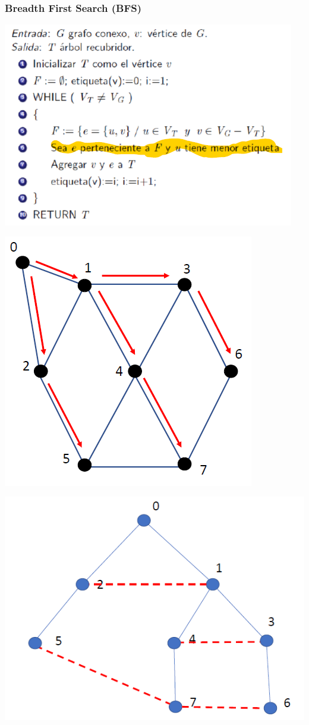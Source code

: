 \documentclass{article}
\begin{document}
\subsubsection{Breadth First Search (BFS)}
\begin{center}
    \includegraphics[width=.60\textwidth]{algBFS.PNG}
\end{center}
\begin{minipage}{.5\textwidth}
    \begin{center}
        \includegraphics[width=.60\textwidth]{grafoBFS1.PNG}
    \end{center}
\end{minipage}
\begin{minipage}{.5\textwidth}
    \begin{center}
        \includegraphics[width=.80\textwidth]{grafoBFS2.PNG}
    \end{center}
\end{minipage}
\end{document}
